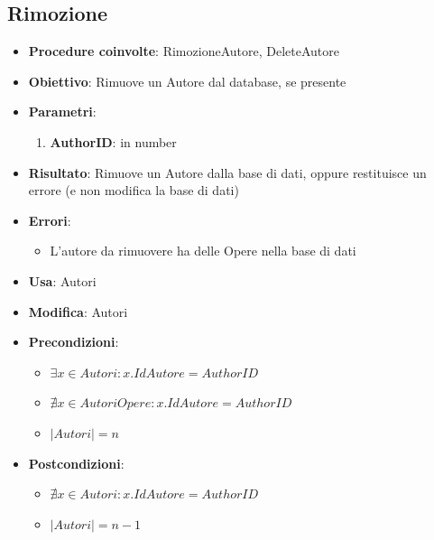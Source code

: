 \subsection{Rimozione}
\begin{itemize}
	\item \textbf{Procedure coinvolte}: RimozioneAutore, DeleteAutore
	\item \textbf{Obiettivo}: Rimuove un Autore dal database, se presente
	\item \textbf{Parametri}:
	\begin{enumerate}
		\item \textbf{AuthorID}: in number
	\end{enumerate}
	\item \textbf{Risultato}: Rimuove un Autore dalla base di dati, oppure restituisce un errore (e non modifica la base di dati)
	\item \textbf{Errori}: 
	\begin{itemize}
		\item L'autore da rimuovere ha delle Opere nella base di dati
	\end{itemize}
	\item \textbf{Usa}: Autori
	\item \textbf{Modifica}: Autori
	\item \textbf{Precondizioni}:
	\begin{itemize}
		\item $\exists x \in Autori : x.IdAutore = AuthorID$
		\item $\nexists x \in AutoriOpere : x.IdAutore = AuthorID$
		\item $|Autori| = n$
	\end{itemize}
	\item \textbf{Postcondizioni}:
	\begin{itemize}
		\item $\nexists x \in Autori : x.IdAutore = AuthorID$
		\item $|Autori| = n - 1$
	\end{itemize}
\end{itemize}

